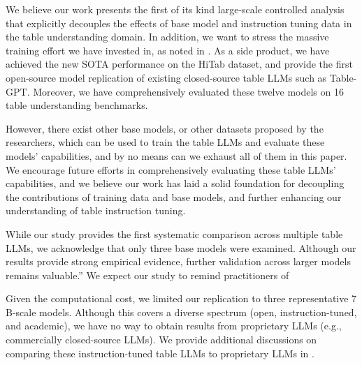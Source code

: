 \documentclass[11pt]{article}
\begin{document}
We believe our work presents the first of its kind large-scale controlled analysis that explicitly decouples the effects of base model and instruction tuning data in the table understanding domain.
In addition, we want to stress the massive training effort we have invested in, as noted in .
As a side product, we have achieved the new SOTA performance on the HiTab dataset, and provide the first open-source model replication of existing closed-source table LLMs such as Table-GPT.
Moreover, we have comprehensively evaluated these twelve models on 16 table understanding benchmarks.

However, there exist other base models, or other datasets proposed by the researchers, which can be used to train the table LLMs and evaluate these models' capabilities, and by no means can we exhaust all of them in this paper.
We encourage future efforts in comprehensively evaluating these table LLMs' capabilities, and we believe our work has laid a solid foundation for decoupling the contributions of training data and base models, and further enhancing our understanding of table instruction tuning.

While our study provides the first systematic comparison across multiple table LLMs, we acknowledge that only three base models were examined. 
Although our results provide strong empirical evidence, further validation across larger models remains valuable.”
We expect our study to remind practitioners of 

Given the computational cost, we limited our replication to three representative 7 B-scale models. 
Although this covers a diverse spectrum (open, instruction-tuned, and academic), we have no way to obtain results from proprietary LLMs (e.g., commercially closed-source LLMs).
We provide additional discussions on comparing these instruction-tuned table LLMs to proprietary LLMs in .
\end{document}
